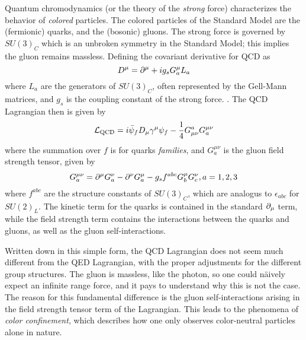 Quantum chromodynamics (or the theory of the \textit{strong} force) characterizes the behavior of \textit{colored} particles.
The colored particles of the Standard Model are the (fermionic) quarks, and the (bosonic) gluons.
The strong force is governed by $SU(3)_C$ which is an unbroken symmetry in the Standard Model; this implies the gluon remains massless.
Defining the covariant derivative for QCD as
\begin{equation}
D^\mu = \partial^\mu + ig_s G^\mu_a L_a
\end{equation}
where $L_a$ are the generators of $SU(3)_C$, often represented by the Gell-Mann matrices, and $g_s$ is the coupling constant of the strong force. .
The QCD Lagrangian then is given by
\begin{equation}
\mathcal{L}_{\text{QCD}} = i \bar{\psi}_f D_\mu \gamma^\mu \psi_f - \frac{1}{4} G^a_{\mu\nu} G_a^{\mu\nu}
\end{equation}
where the summation over $f$ is for quarks \textit{families}, and $ G_a^{\mu\nu}$ is the gluon field strength tensor, given by
\begin{equation}
G^{\mu\nu}_a = \partial^\mu G^\nu_a - \partial^\nu G^\mu_a - g_s f^{abc} G^\mu_b G^\nu_c, a = 1,2,3
\end{equation}
where $f^{abc}$ are the structure constants of $SU(3)_C$, which are analogus  to $\epsilon_{abc}$ for $SU(2)_L$.
The kinetic term for the quarks is contained in the standard $\partial_\mu$ term, while the field strength term contains the interactions between the quarks and gluons, as well as the gluon self-interactions.

Written down in this simple form, the QCD Lagrangian does not seem much different from the QED Lagrangian, with the proper adjustments for the different group structures.
The gluon is massless, like the photon, so one could n\"aively expect an infinite range force, and it pays to understand why this is not the case.
The reason for this fundamental difference is the gluon self-interactions   arising in the field strength tensor term of the Lagrangian.
This leads to the phenomena of \textit{color confinement}, which describes how one only observes color-neutral particles alone in nature.











